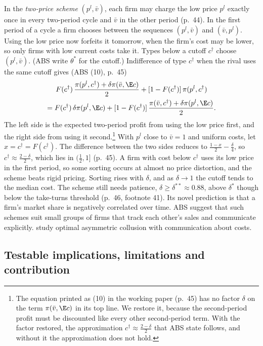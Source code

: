 In the \emph{two-price scheme} $(p^l, \bar v)$, each firm may charge the low price $p^l$ exactly once in every
two-period cycle and $\bar v$ in the other period (p.~44). In the first period of a cycle a firm chooses between the
sequences $(p^l, \bar v)$ and $(\bar v, p^l)$. Using the low price now forfeits it tomorrow, when the firm's cost may
be lower, so only firms with low current costs take it. Types below a cutoff $c^\dagger$ choose $(p^l, \bar v)$. (ABS
write $\theta^*$ for the cutoff.)
Indifference of type $c^\dagger$ when the rival uses the same cutoff gives (ABS (10), p.~45)
\begin{multline*}
F(c^\dagger)\,\frac{\pi(p^l, c^\dagger) + \delta\pi(\bar v, \E c)}{2} + [1 - F(c^\dagger)]\,\pi(p^l, c^\dagger) \\
= F(c^\dagger)\,\delta\pi(p^l, \E c) + [1 - F(c^\dagger)]\,\frac{\pi(\bar v, c^\dagger) + \delta\pi(p^l, \E c)}{2} .
\end{multline*}
The left side is the expected two-period profit from using the low price first, and the right side from using it
second.\footnote{The equation printed as (10) in the working paper (p.~45) has no factor $\delta$ on the term
$\pi(\bar v, \E c)$ in its top line. We restore it, because the second-period profit must be discounted like every
other second-period term. With the factor restored, the approximation $c^\dagger \approx \frac{2 - \delta}{2}$ that ABS
state follows, and without it the approximation does not hold.} With $p^l$ close to $\bar v = 1$ and uniform costs, let $x = c^\dagger = F(c^\dagger)$. The difference between
the two sides reduces to $\frac{1 - x}{2} - \frac{\delta}{4}$, so $c^\dagger \approx \frac{2 - \delta}{2}$, which lies in
$(\frac{1}{2}, 1]$ (p.~45). A firm with cost below $c^\dagger$ uses its low price in the first period, so some sorting
occurs at almost no price distortion, and the scheme beats rigid pricing. Sorting rises with $\delta$, and as
$\delta \to 1$ the cutoff tends to the median cost. The scheme still needs patience, $\delta \ge \delta^{**} \approx
0.88$, above $\delta^*$ though below the take-turns threshold (p.~46, footnote 41). Its novel prediction is that a
firm's market share is negatively correlated over time. ABS suggest that such schemes suit small groups of firms that
track each other's sales and communicate explicitly. \citet{AtheyBagwell2001} study optimal asymmetric collusion with
communication about costs.

\subsection{Testable implications, limitations and contribution}\label{sec:12-abs-assessment}

